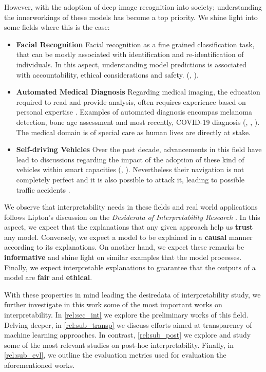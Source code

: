 \noindent However, with the adoption of deep image recognition into society; understanding the 
innerworkings of these models has become a top priority. We shine light into some fields where 
this is the case:
\begin{itemize}
    \item \textbf{Facial Recognition} Facial recognition as a fine grained classification task, 
    that can be mostly associated with identification and re-identification of individuals. 
    In this aspect, understanding model predictions is associated with accountability, ethical 
    considerations and safety.
    (\cite{selinger2020inconsentability}, \cite{andrejevic2020facial}).
    \item \textbf{Automated Medical Diagnosis} Regarding medical imaging, the education 
    required to read and provide analysis, often requires experience based 
    on personal expertise \autocite{nakashima2013visual}. Examples of automated diagnosis encompas 
    melanoma detection, bone age assessment and most recently, COVID-19 diagnosis (\cite{yu2016automated}, 
    \cite{BoNet2019hand}, \cite{huang2021artificial}). The medical domain is of special care 
    as human lives are directly at stake.
    \item \textbf{Self-driving Vehicles} Over the past decade, advancements in this field have lead to 
    discussions regarding the impact of the adoption of these kind of vehicles within smart capacities 
    (\cite{duarte2018impact}, \cite{millard2018pedestrians}). Nevertheless their 
    navigation is not completely perfect and it is also possible to attack it, leading to possible 
    traffic accidents \autocite{dixit2016autonomous}.
\end{itemize}

We observe that interpretability needs in these fields and real world applications follows 
Lipton's discussion on the \textit{Desiderata of Interpretability Research} 
\autocite{mythos_interp}. In this aspect, we expect that the explanations that any given 
approach help us \textbf{trust} any model. Conversely, we expect a model to be explained in a 
\textbf{causal} manner according to its explanations. On another hand, 
we expect these remarks be \textbf{informative} and shine light on similar examples that the 
model processes. Finally, we expect interpretable explanations to guarantee that the outputs 
of a model are \textbf{fair} and \textbf{ethical}.

With these properties in mind leading the desiredata of interpretability study, we further 
investigate in this work some of the most important works on interpretability. In 
\autoref{rel:sec_int} we explore the preliminary works of this field. Delving deeper, in 
\autoref{rel:sub_transp} we discuss efforts aimed at transparency of machine learning approaches. 
In contrast, \autoref{rel:sub_post} we explore and study 
some of the most relevant studies on post-hoc interpretability. Finally, in \autoref{rel:sub_evl}, 
we outline the evaluation metrics used for evaluation the aforementioned works.

\newpage

\newpage

